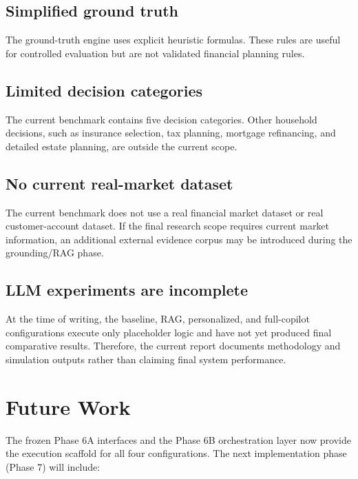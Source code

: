 \documentclass[12pt,a4paper]{article}
\begin{document}
\subsection{Simplified ground truth}

The ground-truth engine uses explicit heuristic formulas. These rules are useful for controlled evaluation but are not validated financial planning rules.

\subsection{Limited decision categories}

The current benchmark contains five decision categories. Other household decisions, such as insurance selection, tax planning, mortgage refinancing, and detailed estate planning, are outside the current scope.

\subsection{No current real-market dataset}

The current benchmark does not use a real financial market dataset or real customer-account dataset. If the final research scope requires current market information, an additional external evidence corpus may be introduced during the grounding/RAG phase.

\subsection{LLM experiments are incomplete}

At the time of writing, the baseline, RAG, personalized, and full-copilot configurations execute only placeholder logic and have not yet produced final comparative results. Therefore, the current report documents methodology and simulation outputs rather than claiming final system performance.

\section{Future Work}

The frozen Phase 6A interfaces and the Phase 6B orchestration layer now provide the execution scaffold for all four configurations. The next implementation phase (Phase 7) will include:
\end{document}
